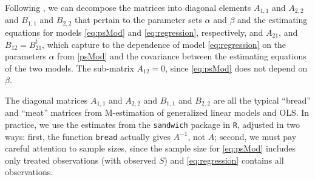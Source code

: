 \documentclass[11pt]{article} %
\begin{document}
Following \citet[][p. 373]{carroletal06}, we %
can decompose the matrices into diagonal elements $A_{1,1}$ and $A_{2,2}$ and $B_{1,1}$ and $B_{2,2}$ that pertain to the parameter sets $\alpha$ and $\beta$ and the estimating equations for models \eqref{eq:psMod} and  \eqref{eq:regression}, respectively, and $A_{21}$, and $B_{12}=B_{21}^t$, which capture to the dependence of model \eqref{eq:regression} on the parameters $\alpha$ from \eqref{psMod} and the covariance between the estimating equations of the two models. The sub-matrix $A_{12}=0$, since \eqref{eq:psMod} does not depend on $\beta$.

The diagonal matrices $A_{1,1}$ and $A_{2,2}$ and $B_{1,1}$ and $B_{2,2}$ are all the typical ``bread'' and ``meat'' matrices from M-estimation of generalized linear models and OLS. In practice, we use the estimates from the \texttt{sandwich} package in \texttt{R}, adjusted in two ways: first, the function \texttt{bread} actually gives $A^{-1}$, not $A$; second, we must pay careful attention to sample sizes, since the sample size for \eqref{eq:psMod} includes only treated observations (with observed $S$) and \eqref{eq:regression} contains all observations.
\end{document}
